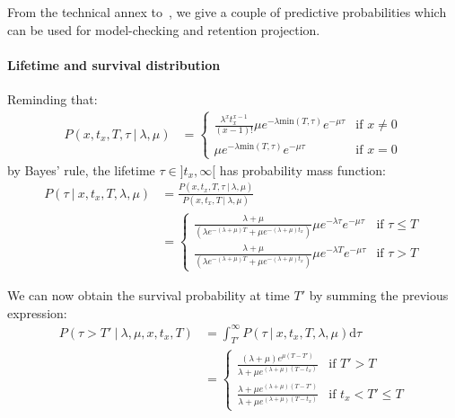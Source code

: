 \documentclass{tufte-book}
\begin{document}
From the technical annex to~\cite{Abe2009}, we give a couple of
predictive probabilities which can be used for model-checking and
retention projection.

\paragraph{Lifetime and survival distribution}
\label{par:lifetimeandsurvivaldistribution}
Reminding that:
\begin{align*}
  P(x, t_x, T, \tau\ | \ \lambda, \mu)
  & = \left\{
    \begin{array}{ll}
      \frac{\lambda^x t_x^{x-1}}{(x-1)!} \mu e^{-\lambda \textrm{min}(T,\tau)} e^{-\mu \tau}
      & \text{if } x \ne 0\\
       \mu e^{-\lambda \textrm{min}(T,\tau)} e^{-\mu \tau}
      & \text{if } x = 0      
    \end{array}
    \right.
\end{align*}
by Bayes' rule, the lifetime $\tau \in ]t_x, \infty[$ has
probability mass function:
\begin{align*}
  P(\tau\ | \ x, t_x, T, \lambda, \mu)
  & = \frac{P(x, t_x, T, \tau\ | \ \lambda, \mu)}{
    P(x,t_x,T\ |\ \lambda, \mu) } \\
  & = \left\{
    \begin{array}{ll}
      \frac{\lambda + \mu}{ \left( \lambda
      e^{-(\lambda+\mu)T}+ \mu e^{-(\lambda+\mu)t_x} \right)}
       \mu e^{-\lambda\tau} e^{-\mu \tau}
      & \text{if } \tau \le T \\
      \frac{\lambda + \mu}{ \left( \lambda
      e^{-(\lambda+\mu)T}+ \mu e^{-(\lambda+\mu)t_x} \right)}
      \mu e^{-\lambda T} e^{ - \mu \tau}
      & \text{if } \tau > T
    \end{array}
    \right.
\end{align*}

We can now obtain the survival probability at time $T'$ by summing the
previous expression:
\begin{align*}
  P(\tau > T' \ | \ \lambda, \mu, x, t_x, T)
  & = \int_{T'}^\infty P(\tau\ | \ x, t_x, T, \lambda, \mu) \mathrm{d}\tau\\
  & = \left\{
    \begin{array}{ll}
      \frac{(\lambda + \mu)e^{\mu(T-T')}}{
      \lambda + \mu e^{(\lambda+\mu)(T-t_x)}}
      & \text{if } T' > T \\
      \frac{\lambda + \mu e^{(\lambda +\mu)(T-T')}}{
      \lambda + \mu e^{(\lambda+\mu)(T-t_x)}}
      & \text{if } t_x < T' \le T
    \end{array}
    \right.
\end{align*}
\end{document}
